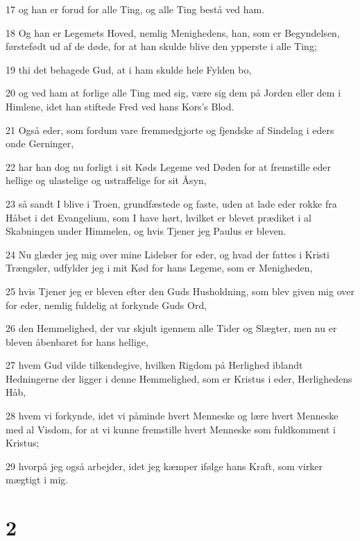 \par 17 og han er forud for alle Ting, og alle Ting bestå ved ham.
\par 18 Og han er Legemets Hoved, nemlig Menighedens, han, som er Begyndelsen, førstefødt ud af de døde, for at han skulde blive den ypperste i alle Ting;
\par 19 thi det behagede Gud, at i ham skulde hele Fylden bo,
\par 20 og ved ham at forlige alle Ting med sig, være sig dem på Jorden eller dem i Himlene, idet han stiftede Fred ved hans Kors's Blod.
\par 21 Også eder, som fordum vare fremmedgjorte og fjendske af Sindelag i eders onde Gerninger,
\par 22 har han dog nu forligt i sit Køds Legeme ved Døden for at fremstille eder hellige og ulastelige og ustraffelige for sit Åsyn,
\par 23 så sandt I blive i Troen, grundfæstede og faste, uden at lade eder rokke fra Håbet i det Evangelium, som I have hørt, hvilket er blevet prædiket i al Skabningen under Himmelen, og hvis Tjener jeg Paulus er bleven.
\par 24 Nu glæder jeg mig over mine Lidelser for eder, og hvad der fattes i Kristi Trængsler, udfylder jeg i mit Kød for hans Legeme, som er Menigheden,
\par 25 hvis Tjener jeg er bleven efter den Guds Husholdning, som blev given mig over for eder, nemlig fuldelig at forkynde Guds Ord,
\par 26 den Hemmelighed, der var skjult igennem alle Tider og Slægter, men nu er bleven åbenbaret for hans hellige,
\par 27 hvem Gud vilde tilkendegive, hvilken Rigdom på Herlighed iblandt Hedningerne der ligger i denne Hemmelighed, som er Kristus i eder, Herlighedens Håb,
\par 28 hvem vi forkynde, idet vi påminde hvert Menneske og lære hvert Menneske med al Visdom, for at vi kunne fremstille hvert Menneske som fuldkomment i Kristus;
\par 29 hvorpå jeg også arbejder, idet jeg kæmper ifølge hans Kraft, som virker mægtigt i mig.

\chapter{2}

